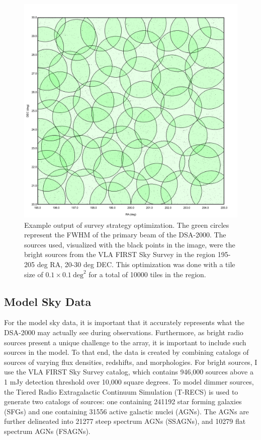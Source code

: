 \documentclass{article}
\begin{document}
\begin{multicols*}{2}
\begin{figure}
    \centering
    \includegraphics[width=\textwidth]{images/20_195_to_30_205.PNG}
    \caption{Example output of survey strategy optimization. The green circles represent the FWHM of the primary beam of the DSA-2000. The sources used, visualized with the black points in the image, were the bright sources from the VLA FIRST Sky Survey in the region 195-205 deg RA, 20-30 deg DEC. This optimization was done with a tile size of $0.1\times0.1\ \mbox{deg}^2$ for a total of 10000 tiles in the region.}
    \label{fig:survey_example}
\end{figure}

\subsection{Model Sky Data}

For the model sky data, it is important that it accurately represents what the DSA-2000 may actually see during observations. Furthermore, as bright radio sources present a unique challenge to the array, it is important to include such sources in the model. To that end, the data is created by combining catalogs of sources of varying flux densities, redshifts, and morphologies. For bright sources, I use the VLA FIRST Sky Survey catalog, which contains 946,000 sources above a 1 mJy detection threshold over 10,000 square degrees. To model dimmer sources, the Tiered Radio Extragalactic Continuum Simulation (T-RECS) \cite{trecs} is used to generate two catalogs of sources: one containing 241192 star forming galaxies (SFGs) and one containing 31556 active galactic nuclei (AGNs). The AGNs are further delineated into 21277 steep spectrum AGNs (SSAGNs), and 10279 flat spectrum AGNs (FSAGNs).


\end{multicols*}
\end{document}
